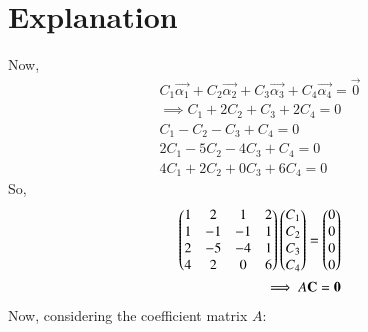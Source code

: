 \documentclass[journal,12pt,twocolumn]{IEEEtran}
\begin{document}
\section{Explanation}
Now,
\begin{align}
C_1 \vec{\alpha_1} +C_2 \vec{\alpha_2}+C_3 \vec{\alpha_3}+C_4 \vec{\alpha_4} = \vec{0}\\
\implies C_1 + 2C_2 + C_3 + 2C_4 =0\\
C_1 - C_2 - C_3 + C_4 =0\\
2C_1 - 5C_2 - 4C_3 + C_4 =0\\
4C_1 + 2C_2 + 0C_3 + 6C_4 =0
\end{align}
So, 
\begin{align}
\begin{pmatrix}1 & 2 & 1 & 2\\1 & -1 & -1 & 1\\2 & -5 & -4 & 1\\4 & 2 & 0 & 6\end{pmatrix} \begin{pmatrix}C_1\\C_2\\C_3\\C_4\end{pmatrix} = \begin{pmatrix}0\\0\\0\\0\end{pmatrix}\\
\implies A\mathbf{C} = \mathbf{0}
\end{align}
Now, considering the coefficient matrix $A$:
\end{document}
